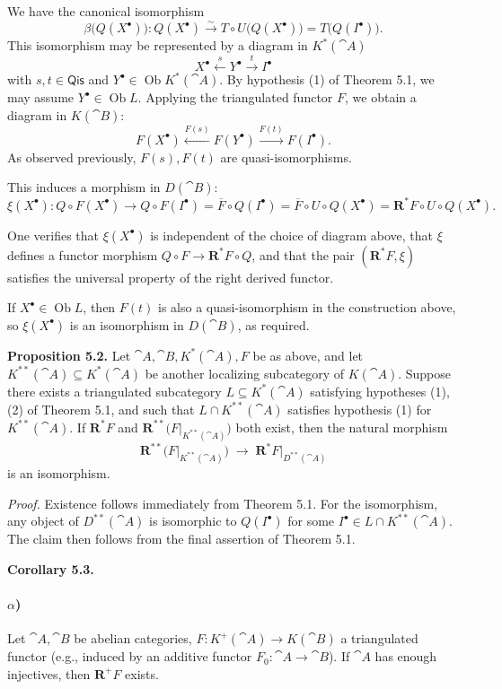 \setcounter{page}{55}
We have the canonical isomorphism
\[
\beta\big(Q(X^\bullet)\big)\colon Q(X^\bullet) \stackrel{\sim}{\longrightarrow}
T\circ U\big(Q(X^\bullet)\big) = T\big(Q(I^\bullet)\big).
\]
This isomorphism may be represented by a diagram in \(K^*(\cat{A})\)
\[
X^\bullet \xleftarrow{s} Y^\bullet \xrightarrow{t} I^\bullet
\]
with \(s,t\in\mathsf{Qis}\) and \(Y^\bullet\in\operatorname{Ob}K^*(\cat{A})\). By hypothesis (1) of Theorem 5.1, we may assume \(Y^\bullet\in\operatorname{Ob}L\). Applying the triangulated functor \(F\), we obtain a diagram in \(K(\cat{B})\):
\[
F(X^\bullet) \xleftarrow{F(s)} F(Y^\bullet) \xrightarrow{F(t)} F(I^\bullet).
\]
As observed previously, \(F(s),F(t)\) are quasi-isomorphisms.

This induces a morphism in \(D(\cat{B})\):
\[
\xi(X^\bullet)\colon Q\circ F(X^\bullet)
\to Q\circ F(I^\bullet)
= \overline{F}\circ Q(I^\bullet)
= \overline{F}\circ U\circ Q(X^\bullet)
= \mathbf{R}^*F\circ U\circ Q(X^\bullet).
\]

One verifies that \(\xi(X^\bullet)\) is independent of the choice of diagram above, that \(\xi\) defines a functor morphism \(Q\circ F\to \mathbf{R}^*F\circ Q\), and that the pair \((\mathbf{R}^*F,\xi)\) satisfies the universal property of the right derived functor.

\setcounter{page}{56}
If \(X^\bullet\in\operatorname{Ob}L\), then \(F(t)\) is also a quasi-isomorphism in the construction above, so \(\xi(X^\bullet)\) is an isomorphism in \(D(\cat{B})\), as required.

\medskip
\textbf{Proposition 5.2.}
Let \(\cat{A},\cat{B},K^*(\cat{A}),F\) be as above, and let \(K^{**}(\cat{A})\subseteq K^*(\cat{A})\) be another localizing subcategory of \(K(\cat{A})\). Suppose there exists a triangulated subcategory \(L\subseteq K^*(\cat{A})\) satisfying hypotheses (1),(2) of Theorem 5.1, and such that \(L\cap K^{**}(\cat{A})\) satisfies hypothesis (1) for \(K^{**}(\cat{A})\).
If \(\mathbf{R}^*F\) and \(\mathbf{R}^{**}\big(F|_{K^{**}(\cat{A})}\big)\) both exist, then the natural morphism
\[
\mathbf{R}^{**}\big(F|_{K^{**}(\cat{A})}\big)
\;\to\;
\mathbf{R}^*F\big|_{D^{**}(\cat{A})}
\]
is an isomorphism.

\textit{Proof.} Existence follows immediately from Theorem 5.1. For the isomorphism, any object of \(D^{**}(\cat{A})\) is isomorphic to \(Q(I^\bullet)\) for some \(I^\bullet\in L\cap K^{**}(\cat{A})\). The claim then follows from the final assertion of Theorem 5.1.

\medskip
\textbf{Corollary 5.3.}
\paragraph{$\alpha$)}
Let \(\cat{A},\cat{B}\) be abelian categories, \(F\colon K^+(\cat{A})\to K(\cat{B})\) a triangulated functor (e.g., induced by an additive functor \(F_0\colon\cat{A}\to\cat{B}\)). If \(\cat{A}\) has enough injectives, then \(\mathbf{R}^+F\) exists.

